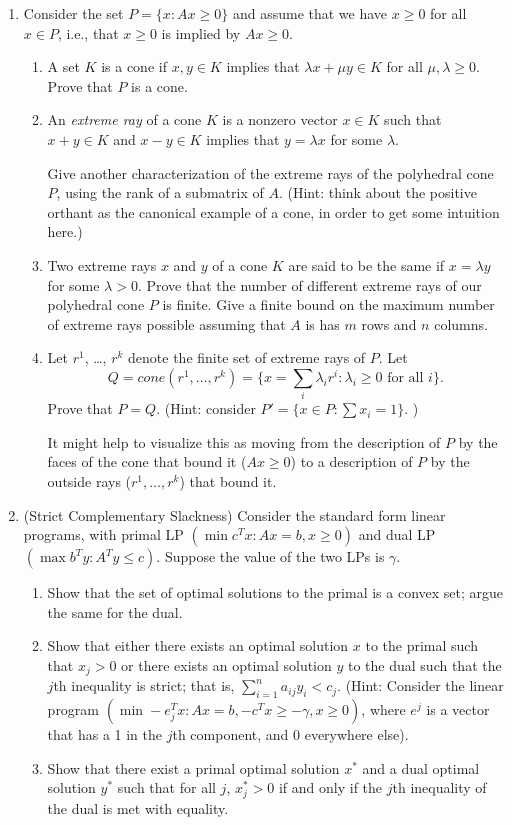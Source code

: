 \documentclass[11pt]{article}
\begin{document}
\begin{enumerate}
\item Consider the set $P=\{x: A x \ge 0\}$ and assume that we have $x \ge 0$
for all $x \in P$, i.e., that $x \ge 0$ is implied by $ A x \ge 0$.
\begin{enumerate}
\item A set $K$ is a cone if $x,y\in K$ implies that $\lambda x + \mu y \in K$
for all $\mu, \lambda \ge 0$. Prove that $P$ is a cone.
\item An {\em extreme ray} of a cone $K$ is a nonzero vector $x \in K$ such
that $x+y \in K$ and $x-y \in K$ implies that $y=\lambda x$ for some
$\lambda$.

Give another characterization of the extreme rays of the polyhedral cone $P$,
using the rank of a submatrix of $A$. (Hint: think about the positive orthant
as the canonical example of a cone, in order to get some intuition here.)

\item Two extreme rays $x$ and $y$ of a cone $K$ are said to be the same if
$x=\lambda y$ for some $\lambda >0$.  Prove that the number of different
extreme rays of our polyhedral cone $P$ is finite. Give a finite bound on
the maximum number of extreme rays possible assuming that $A$ is has $m$ rows
and $n$ columns.
\item Let $r^1$, \ldots, $r^k$ denote the finite set of extreme rays of
$P$. Let
$$Q= cone(r^1,\ldots,r^k)=
\{x=\sum_i \lambda_i r^i: \lambda_i \ge 0 \mbox{ for all $i$}\}.
$$
Prove that $P=Q$. (Hint: consider $P'=\{x \in P: \sum x_i=1\}$. )

It might help to visualize this as moving from the description of
$P$ by the faces of the cone that bound it ($Ax \ge 0$) to a
description of $P$ by the outside rays ($r^1, \ldots, r^k$) that
bound it.
\end{enumerate}


\item (Strict Complementary Slackness)  Consider the standard form linear programs, with primal LP $(\min c^Tx: Ax = b, x \geq 0)$ and dual LP $(\max b^Ty: A^Ty \leq c)$.  Suppose the value of the two LPs is $\gamma$.
\begin{enumerate}
\item Show that the set of optimal solutions to the primal is a convex set; argue the same for the dual.
\item Show that either there exists an optimal solution $x$ to the primal such that $x_j > 0$ or there exists an optimal solution $y$ to the dual such that the $j$th inequality is strict; that is,  $\sum_{i=1}^na_{ij}y_i < c_j.$  (Hint: Consider the linear program $(\min -e_j^Tx: Ax = b, -c^Tx \geq -\gamma, x \geq 0)$, where $e^j$ is a vector that has a 1 in the $j$th component, and 0 everywhere else).
\item  Show that there exist a primal optimal solution $x^*$ and a dual optimal solution $y^*$ such that for all $j$, $x^*_j > 0$ if and only if the $j$th inequality of the dual is met with equality.
\end{enumerate}

    

\end{enumerate}
\end{document}
